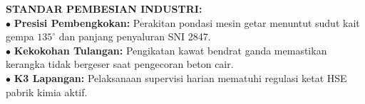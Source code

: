 \documentclass[10pt,a4paper,landscape]{article}
\begin{document}
\begin{minipage}[t]{0.30\linewidth}
  \begin{tcolorbox}[sharp corners, boxrule=0.6pt, colframe=pnavy, colback=pbglight, left=2.5mm, right=2.5mm, top=2mm, bottom=2mm, height=54mm]
    {\fontsize{7pt}{8.5pt}\selectfont\bfseries\color{pnavy}STANDAR PEMBESIAN INDUSTRI:}\\[1.5mm]
    {\fontsize{6.5pt}{8.2pt}\selectfont\color{psteel}
    $\bullet$ \textbf{Presisi Pembengkokan:} Perakitan pondasi mesin getar menuntut sudut kait gempa $135^\circ$ dan panjang penyaluran SNI 2847.\\
    $\bullet$ \textbf{Kekokohan Tulangan:} Pengikatan kawat bendrat ganda memastikan kerangka tidak bergeser saat pengecoran beton cair.\\
    $\bullet$ \textbf{K3 Lapangan:} Pelaksanaan supervisi harian mematuhi regulasi ketat HSE pabrik kimia aktif.
    }
  \end{tcolorbox}
\end{minipage}%
\hfill
\end{document}
